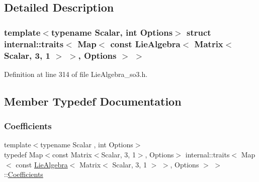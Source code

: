 \subsection{Detailed Description}
\subsubsection*{template$<$typename Scalar, int Options$>$\newline
struct internal\+::traits$<$ Map$<$ const Lie\+Algebra$<$ Matrix$<$ Scalar, 3, 1 $>$ $>$, Options $>$ $>$}



Definition at line 314 of file Lie\+Algebra\+\_\+so3.\+h.



\subsection{Member Typedef Documentation}
\hypertarget{structinternal_1_1traits_3_01_map_3_01const_01_lie_algebra_3_01_matrix_3_01_scalar_00_013_00_011480673ebb2de2c070cfdb8edee3d7437_abd106fedc67f9610cb2b8ee96ce8aa27}{}\label{structinternal_1_1traits_3_01_map_3_01const_01_lie_algebra_3_01_matrix_3_01_scalar_00_013_00_011480673ebb2de2c070cfdb8edee3d7437_abd106fedc67f9610cb2b8ee96ce8aa27} 
\subsubsection{\texorpdfstring{Coefficients}{Coefficients}}
{\footnotesize\ttfamily template$<$typename Scalar , int Options$>$ \\
typedef Map$<$const Matrix$<$Scalar, 3, 1$>$, Options$>$ internal\+::traits$<$ Map$<$ const \hyperlink{class_lie_algebra}{Lie\+Algebra}$<$ Matrix$<$ Scalar, 3, 1 $>$ $>$, Options $>$ $>$\+::\hyperlink{structinternal_1_1traits_3_01_map_3_01const_01_lie_algebra_3_01_matrix_3_01_scalar_00_013_00_011480673ebb2de2c070cfdb8edee3d7437_abd106fedc67f9610cb2b8ee96ce8aa27}{Coefficients}}



